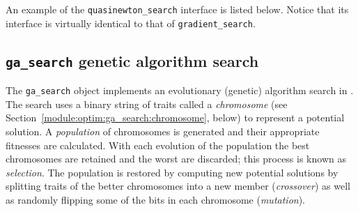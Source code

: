 %
%

An example of the {\tt quasinewton\_search} interface is listed below.
Notice that its interface is virtually identical to that of
{\tt gradient\_search}.


\subsection{{\tt ga\_search} genetic algorithm search}
\label{module:optim:ga_search}

The {\tt ga\_search} object implements an evolutionary (genetic)
algorithm search in \liquid.
The search uses a binary string of traits called a {\em chromosome}
(see Section~\ref{module:optim:ga_search:chromosome}, below)
to represent a potential solution.
A {\em population} of chromosomes is generated and their appropriate
fitnesses are calculated.
With each evolution of the population the best chromosomes are retained
and the worst are discarded; this process is known as {\em selection}.
The population is restored by computing new potential solutions by
splitting traits of the better chromosomes into a new member
({\em crossover}) as well as randomly flipping some of the bits in each
chromosome ({\em mutation}).

